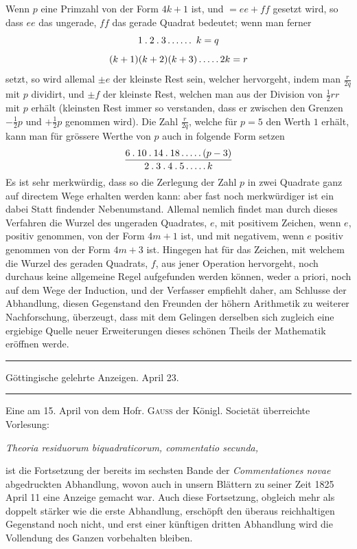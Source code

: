 Wenn $p$ eine Primzahl von der Form $4k+1$ ist, und $=ee+ff$ 
%
gesetzt wird, so dass $ee$ das ungerade, $ff$ das gerade Quadrat bedeutet; wenn man ferner
\[
1\pdot2\pdot3\mathinner{.\,.\,.\,.\,.\,.}\ k=q
\]
\[
(k+1)(k+2)(k+3)\mathinner{.\,.\,.\,.\,.}2k=r
\]
setzt, so wird allemal $\pm e$ der kleinste Rest sein, welcher hervorgeht, indem man $\frac r{2q}$ mit $p$ dividirt, und $\pm f$ der kleinste Rest, welchen man aus der Division von $\frac12rr$ mit $p$ erhält (kleinsten Rest immer so verstanden, dass er zwischen den Grenzen $-\frac12p$ und $+\frac12p$ genommen wird). Die Zahl $\frac r{2q}$, welche für $p=5$ den Werth $1$ erhält, kann man für grössere Werthe von $p$ auch in folgende Form setzen
\[
\frac{6\mathbin{.}10\mathbin{.}14\mathbin{.}18\mathinner{.\,.\,.\,.\,.}(p-3)}{2\mathbin{.}3\mathbin{.}4\mathbin{.}5\mathinner{.\,.\,.\,.\,.} k}
\]
Es ist sehr merkwürdig, dass so die Zerlegung der Zahl $p$ in zwei Quadrate ganz auf directem Wege erhalten werden kann: aber fast noch merkwürdiger ist ein dabei Statt findender Nebenumstand. Allemal nemlich findet man durch dieses Verfahren die Wurzel des ungeraden Quadrates, $e$, mit positivem Zeichen, wenn $e$, positiv genommen, von der Form $4m+1$ ist, und mit negativem, wenn $e$ positiv genommen von der Form $4m+3$ ist. Hingegen hat für das Zeichen, mit welchem die Wurzel des geraden Quadrats, $f$, aus jener Operation hervorgeht, noch durchaus keine allgemeine Regel aufgefunden werden können, weder a priori, noch auf dem Wege der Induction, und der Verfasser empfiehlt daher, am Schlusse der Abhandlung, diesen Gegenstand den Freunden der höhern Arithmetik zu weiterer Nachforschung, überzeugt, dass mit dem Gelingen derselben sich zugleich eine ergiebige Quelle neuer Erweiterungen dieses schönen Theils der Mathematik eröffnen werde.

\clearpage
{}%
\begin{center}
\rule{.82\linewidth}{.35pt}\par
Göttingische gelehrte Anzeigen. April 23.\par
\rule{.82\linewidth}{.35pt}
\end{center}
Eine am 15. April von dem Hofr. \textsc{Gauss} der Königl. Societät überreichte Vorlesung:
\begin{center}\itshape
Theoria residuorum biquadraticorum, commentatio secunda,
\end{center}
ist die Fortsetzung der bereits im sechsten Bande der \emph{Commentationes novae} abgedruckten Abhandlung, wovon auch in unsern Blättern zu seiner Zeit 1825 April 11 eine Anzeige gemacht war. Auch diese Fortsetzung, obgleich mehr als doppelt stärker wie die erste Abhandlung, erschöpft den überaus reichhaltigen Gegenstand noch nicht, und erst einer künftigen dritten Abhandlung wird die Vollendung des Ganzen vorbehalten bleiben.

